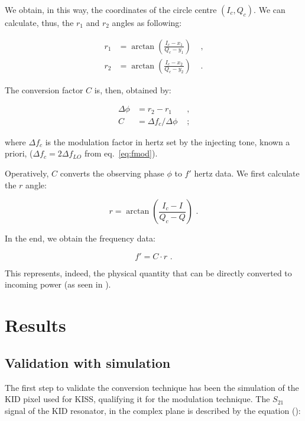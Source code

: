 \documentclass[twocolumn,traditabstract]{aa}\\
\begin{document}
We obtain, in this way, the coordinates of the circle centre $(I_c,Q_c)$. We can calculate, thus, the $r_1$ and $r_2$ angles as following:

\begin{equation}
\begin{align}
r_1 &= \arctan\left( \frac{I_c-x_1}{Q_c - y_1}  \right) &\text{ ,}\\
r_2 &= \arctan\left( \frac{I_c-x_2}{Q_c - y_2}  \right) &\text{ .}
\end{align}
\end{equation}

\noindent The conversion factor $C$ is, then, obtained by:

\begin{equation}
\begin{align}
\Delta \phi &= r_2-r_1 &\text{ ,}\\
C&=\Delta f_c/\Delta\phi &\text{ ;}
\end{align}
\end{equation}

\noindent where $\Delta f_c$ is the modulation factor in hertz set by the injecting tone, known a priori, ($\Delta f_c = 2\Delta f_{LO}$ from eq.~\ref{eq:fmod}).

Operatively, $C$ converts the observing phase $\phi$ to $f'$ hertz data. We first calculate the $r$ angle:


\begin{equation}
r = \arctan \left( \frac{I_c - I}{Q_c - Q} \right) \text{ .}
\end{equation}

\noindent In the end, we obtain the frequency data:

\begin{equation}
f' = C \cdot r \text{ .}
\end{equation}

\noindent This represents, indeed, the physical quantity that can be directly converted to incoming power (as seen in \cite{Swenson}).


\section{Results}
\label{sec:results}

\subsection{Validation with simulation}

The first step to validate the conversion technique has been the simulation of the KID pixel used for KISS, qualifying it for the modulation technique.
The $S_{21}$ signal of the KID resonator, in the complex plane is described by the equation (\cite{Gao}):
\end{document}
